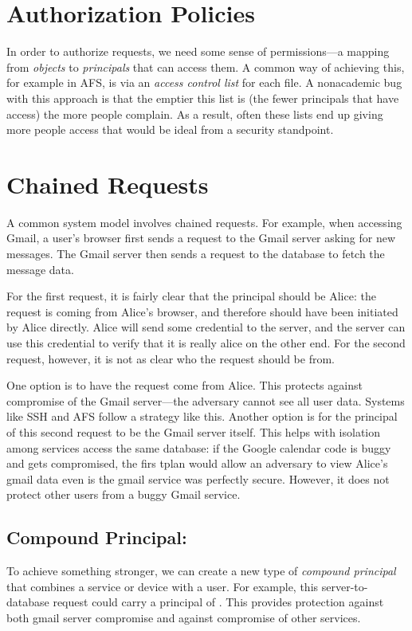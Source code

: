 \section{Authorization Policies}
In order to authorize requests, we need some sense of permissions---a mapping from \emph{objects} to \emph{principals} that can access them. A common way of achieving this, for example in AFS, is via an \emph{access control list} for each file. A nonacademic bug with this approach is that the emptier this list is (the fewer principals that have access) the more people complain. As a result, often these lists end up giving more people access that would be ideal from a security standpoint.

\section{Chained Requests}
A common system model involves chained requests. For example, when accessing Gmail, a user's browser first sends a request to the Gmail server asking for new messages. The Gmail server then sends a request to the database to fetch the message data.

For the first request, it is fairly clear that the principal should be Alice: the request is coming from Alice's browser, and therefore should have been initiated by Alice directly. Alice will send some credential to the server, and the server can use this credential to verify that it is really alice on the other end. For the second request, however, it is not as clear who the request should be from.

One option is to have the request come from Alice. This protects against compromise of the Gmail server---the adversary cannot see all user data. Systems like SSH and AFS follow a strategy like this. Another option is for the principal of this second request to be the Gmail server itself. This helps with isolation among services access the same database: if the Google calendar code is buggy and gets compromised, the firs tplan would allow an adversary to view Alice's gmail data even is the gmail service was perfectly secure. However, it does not protect other users from a buggy Gmail service.

\subsection{Compound Principal: }
To achieve something stronger, we can create a new type of \emph{compound principal} that combines a service or device with a user. For example, this server-to-database request could carry a principal of . This provides protection against both gmail server compromise and against compromise of other services.

